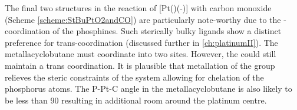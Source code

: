 The final two structures in the reaction of [Pt(\tButhixantphos)(-)] with carbon monoxide (Scheme \ref{scheme:StBuPtO2andCO}) are particularly note-worthy due to the \cis-coordination of the phosphines.  Such sterically bulky ligands show a distinct preference for trans-coordination (discussed further in \ref{ch:platinumII}).  The metallacyclobutane must coordinate into two \cis{} sites. However, the \tBuxantphos{} could still maintain a trans coordination.  It is plausible that metallation of the \tBu{} group relieves the steric constraints of the system allowing for \cis{} chelation of the phosphorus atoms.  The P-Pt-C angle in the metallacyclobutane is also likely to be less than 90\degrees{} resulting in additional room around the platinum centre.  


